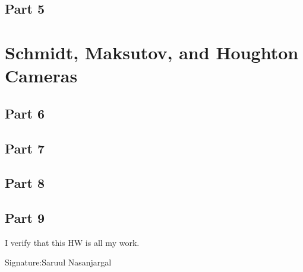 \documentclass[11pt]{article}
\begin{document}
\subsection*{Part 5}

\section*{Schmidt, Maksutov, and Houghton Cameras}

\subsection*{Part 6}

\subsection*{Part 7}

\subsection*{Part 8}

\subsection*{Part 9}

\vspace{1.2em}
\noindent I verify that this HW is all my work.

\vspace{0.9em}
\noindent Signature:\hspace{0.6em}\underline{\hspace{2.4in}}\hspace{1.2em}Saruul Nasanjargal
\end{document}
